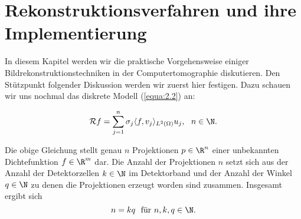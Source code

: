 \chapter{Rekonstruktionsverfahren und ihre Implementierung}
\label{cha:3}

In diesem Kapitel werden wir die praktische Vorgehensweise einiger Bildrekonstruktionstechniken in der Computertomographie diskutieren. Den Stützpunkt folgender Diskussion werden wir zuerst hier festigen. Dazu schauen wir uns nochmal das diskrete Modell (\ref{equa:2.2}) an:

\[\mathcal{R}f = \sum\limits_{j = 1}^{n} \sigma_j \langle f, v_j\rangle_{L^2(\Omega)} u_j, \ \ n \in \N.\] 

Die obige Gleichung stellt genau $n$ Projektionen $p \in \R^n$ einer unbekannten Dichtefunktion $f \in \R^m$ dar. Die Anzahl der Projektionen $n$ setzt sich aus der Anzahl der Detektorzellen $k \in  \N$ im Detektorband und der Anzahl der Winkel $q \in \N$ zu denen die Projektionen erzeugt worden sind zusammen. Insgesamt ergibt sich
\begin{equation}
	n = kq \ \ \mbox{für} \ n,k,q \in \N.
	\label{equa:3.1}
\end{equation}
